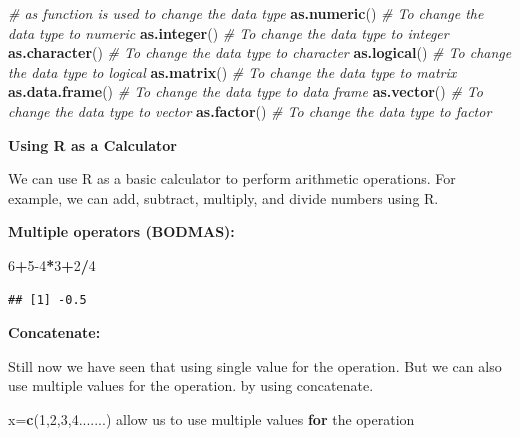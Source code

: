 \documentclass[
]{article}
\newenvironment{Shaded}{\begin{snugshade}}{\end{snugshade}}
\newcommand{\CommentTok}[1]{\textcolor[rgb]{0.56,0.35,0.01}{\textit{#1}}}
\newcommand{\ControlFlowTok}[1]{\textcolor[rgb]{0.13,0.29,0.53}{\textbf{#1}}}
\newcommand{\DecValTok}[1]{\textcolor[rgb]{0.00,0.00,0.81}{#1}}
\newcommand{\FunctionTok}[1]{\textcolor[rgb]{0.13,0.29,0.53}{\textbf{#1}}}
\newcommand{\NormalTok}[1]{#1}
\newcommand{\OtherTok}[1]{\textcolor[rgb]{0.56,0.35,0.01}{#1}}
\newcommand{\SpecialCharTok}[1]{\textcolor[rgb]{0.81,0.36,0.00}{\textbf{#1}}}
\begin{document}
\begin{Shaded}
\begin{Highlighting}[]
\CommentTok{\# as function is used to change the data type}
\FunctionTok{as.numeric}\NormalTok{() }\CommentTok{\# To change the data type to numeric}
\FunctionTok{as.integer}\NormalTok{() }\CommentTok{\# To change the data type to integer}
\FunctionTok{as.character}\NormalTok{() }\CommentTok{\# To change the data type to character}
\FunctionTok{as.logical}\NormalTok{() }\CommentTok{\# To change the data type to logical}
\FunctionTok{as.matrix}\NormalTok{() }\CommentTok{\# To change the data type to matrix}
\FunctionTok{as.data.frame}\NormalTok{() }\CommentTok{\# To change the data type to data frame}
\FunctionTok{as.vector}\NormalTok{() }\CommentTok{\# To change the data type to vector}
\FunctionTok{as.factor}\NormalTok{() }\CommentTok{\# To change the data type to factor}
\end{Highlighting}
\end{Shaded}

\textbf{Using R as a Calculator}

We can use R as a basic calculator to perform arithmetic operations. For
example, we can add, subtract, multiply, and divide numbers using R.

\textbf{Multiple operators (BODMAS):}

\begin{Shaded}
\begin{Highlighting}[]
 \DecValTok{6}\SpecialCharTok{+}\DecValTok{5{-}4}\SpecialCharTok{*}\DecValTok{3}\SpecialCharTok{+}\DecValTok{2}\SpecialCharTok{/}\DecValTok{4}
\end{Highlighting}
\end{Shaded}

\begin{verbatim}
## [1] -0.5
\end{verbatim}

\textbf{Concatenate:}

Still now we have seen that using single value for the operation. But we
can also use multiple values for the operation. by using concatenate.

\begin{Shaded}
\begin{Highlighting}[]
\NormalTok{x}\OtherTok{=}\FunctionTok{c}\NormalTok{(}\DecValTok{1}\NormalTok{,}\DecValTok{2}\NormalTok{,}\DecValTok{3}\NormalTok{,}\DecValTok{4}\NormalTok{.......)}
\NormalTok{allow us to use multiple values }\ControlFlowTok{for}\NormalTok{ the operation}
\end{Highlighting}
\end{Shaded}
\end{document}
